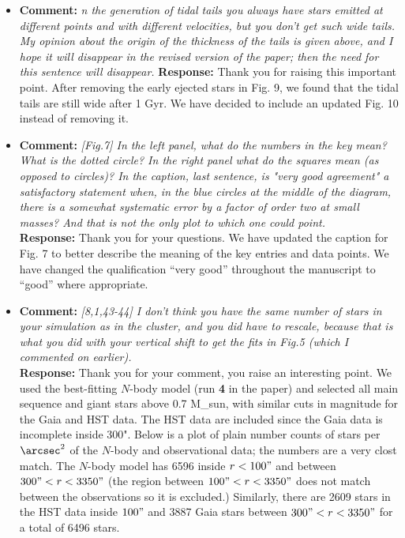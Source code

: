 \documentclass[aps,prl,reprint,showpacs,floatfix,superscriptaddress, onecolumn, 12pt]{revtex4-2}
\begin{document}
\begin{itemize}
    \item
    \textbf{Comment:} \textit{n the generation of tidal tails you always have stars emitted
at different points and with different velocities, but you don't get
such wide tails. My opinion about the origin of the thickness of the
tails is given above, and I hope it will disappear in the revised
version of the paper; then the need for this sentence will disappear.}
    \textbf{Response:} Thank you for raising this important point. After removing the early ejected stars in Fig. 9, we found that the tidal tails are still wide after 1 Gyr. We have decided to include an updated Fig. 10 instead of removing it.


    \item
    \textbf{Comment:} \textit{[Fig.7] In the left panel, what do the numbers in the key mean? What
is the dotted circle? In the right panel what do the squares mean (as
opposed to circles)? In the caption, last sentence, is "very good
agreement" a satisfactory statement when, in the blue circles at the
middle of the diagram, there is a somewhat systematic error by a
factor of order two at small masses? And that is not the only plot to
which one could point.}\\
    \textbf{Response:} Thank you for your questions. We have updated the caption for Fig. 7 to better describe the meaning of the key entries and data points. We have changed the qualification ``very good'' throughout the manuscript to ``good'' where appropriate.


    \item
    \textbf{Comment:} \textit{[8,1,43-44] I don't think you have the same number of stars in your
simulation as in the cluster, and you did have to rescale, because
that is what you did with your vertical shift to get the fits in Fig.5
(which I commented on earlier).}\\
    \textbf{Response:} Thank you for your comment, you raise an interesting point. We used the best-fitting $N$-body model (run \textbf{4} in the paper) and selected all main sequence and giant stars above 0.7 M_sun, with similar cuts in magnitude for the Gaia and HST data. The HST data are included since the Gaia data is incomplete inside 300". Below is a plot of plain number counts of stars per $\arcsec^2$ of the $N$-body and observational data; the numbers are a very clost match. The $N$-body model has 6596 inside $r<100"$ and between $300"<r<3350"$ (the region between $100" < r < 3350"$ does not match between the observations so it is excluded.) Similarly, there are 2609 stars in the HST data inside $100"$ and 3887 Gaia stars between $300"<r<3350"$ for a total of 6496 stars.


\end{itemize}
\end{document}
